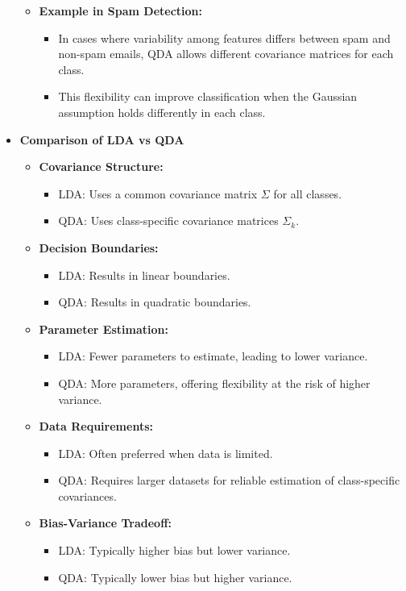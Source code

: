 \documentclass[10pt]{article}
\begin{document}
\begin{itemize}
\begin{itemize}
\begin{itemize}
        \end{itemize}
        \item \textbf{Example in Spam Detection:}
        \begin{itemize}
            \item In cases where variability among features differs between spam and non-spam emails, QDA allows different covariance matrices for each class.
            \item This flexibility can improve classification when the Gaussian assumption holds differently in each class.
        \end{itemize}
    \end{itemize}
    
    \item \textbf{Comparison of LDA vs QDA}
    \begin{itemize}
        \item \textbf{Covariance Structure:}
        \begin{itemize}
            \item LDA: Uses a common covariance matrix \(\Sigma\) for all classes.
            \item QDA: Uses class-specific covariance matrices \(\Sigma_k\).
        \end{itemize}
        \item \textbf{Decision Boundaries:}
        \begin{itemize}
            \item LDA: Results in linear boundaries.
            \item QDA: Results in quadratic boundaries.
        \end{itemize}
        \item \textbf{Parameter Estimation:}
        \begin{itemize}
            \item LDA: Fewer parameters to estimate, leading to lower variance.
            \item QDA: More parameters, offering flexibility at the risk of higher variance.
        \end{itemize}
        \item \textbf{Data Requirements:}
        \begin{itemize}
            \item LDA: Often preferred when data is limited.
            \item QDA: Requires larger datasets for reliable estimation of class-specific covariances.
        \end{itemize}
        \item \textbf{Bias-Variance Tradeoff:}
        \begin{itemize}
            \item LDA: Typically higher bias but lower variance.
            \item QDA: Typically lower bias but higher variance.
        \end{itemize}
    \end{itemize}
    

\end{itemize}
\end{document}
